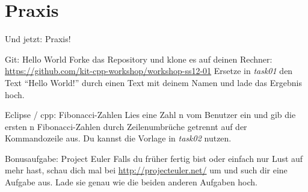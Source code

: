 \section{Praxis}
\begin{frame}{Und jetzt: Praxis!}

	\begin{block}{Git: Hello World}
		Forke das Repository und klone es auf deinen Rechner:
		\url{https://github.com/kit-cpp-workshop/workshop-ss12-01}
		Ersetze in \emph{task01} den Text \enquote{Hello World!} durch einen Text mit deinem Namen und lade das Ergebnis hoch.
	\end{block}
	
	\begin{block}{Eclipse / cpp: Fibonacci-Zahlen}
		Lies eine Zahl n vom Benutzer ein und gib die ersten n Fibonacci-Zahlen durch Zeilenumbrüche getrennt auf der Kommandozeile aus. Du kannst die Vorlage in \emph{task02} nutzen.
	\end{block}
	
	\begin{block}{Bonusaufgabe: Project Euler}
		Falls du früher fertig bist oder einfach nur Lust auf mehr hast, schau dich mal bei \url{http://projecteuler.net/} um und such dir eine Aufgabe aus. Lade sie genau wie die beiden anderen Aufgaben hoch.
	\end{block}
\end{frame}
